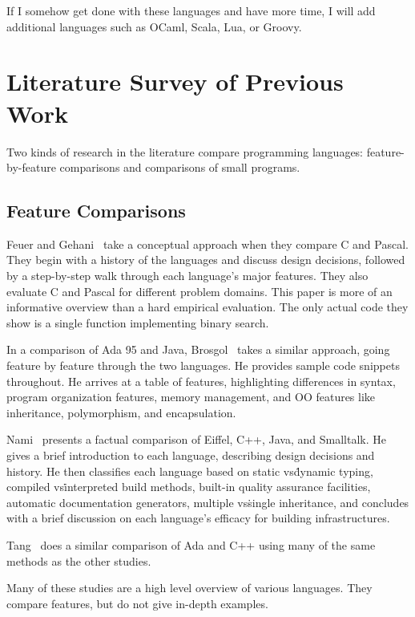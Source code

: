 \documentclass{article}
\begin{document}
If I somehow get done with these languages and have more time, I will
add additional languages such as OCaml, Scala, Lua, or Groovy.

\section{Literature Survey of Previous Work}
\label{sec:survey}

Two kinds of research in the literature compare programming languages:
feature-by-feature comparisons and comparisons of small programs.

\subsection{Feature Comparisons}

Feuer and Gehani~\cite{FeuerCVsPascal} take a conceptual approach when they compare C and
Pascal.  They begin with a history of the languages and
discuss design decisions, followed by a step-by-step walk through each
language's major features.  They also evaluate C and Pascal for different
problem domains.  This paper is more of an informative overview than a hard
empirical evaluation.  The only actual code they show is a single function
implementing binary search.

In a comparison of Ada 95 and Java, Brosgol~\cite{BrosgolCompOOAdaVsJava} takes
a similar approach, going feature by feature through the two languages.  He
provides sample code snippets throughout.  He arrives at a table of features,
highlighting differences in syntax, program organization features, memory
management, and OO features like inheritance, polymorphism, and encapsulation.

Nami~\cite{NamiCompOOSoftEng} presents a factual comparison of Eiffel, C++, Java, and
Smalltalk.  He gives a brief introduction to each
language, describing design decisions and history.  He then classifies each
language based on static vs\. dynamic typing, compiled vs\. interpreted build
methods, built-in quality assurance facilities, automatic documentation
generators, multiple vs\. single inheritance, and concludes with a brief
discussion on each language's efficacy for building infrastructures.

Tang~\cite{TangAdaVsCpp} does a similar comparison of Ada and C++ using many of
the same methods as the other studies.

Many of these studies are a high level overview of various languages.  They
compare features, but do not give in-depth examples.
\end{document}
